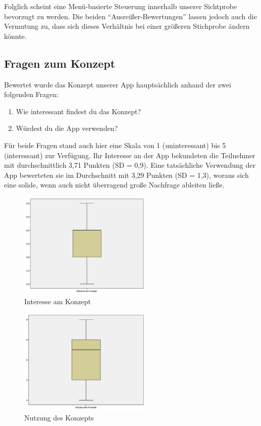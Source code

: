 \documentclass{chi-ext}
\begin{document}
Folglich scheint eine Menü-basierte Steuerung innerhalb unserer Sichtprobe bevorzugt zu werden. Die beiden “Ausreißer-Bewertungen” lassen jedoch auch die Vermutung zu, dass sich dieses Verhältnis bei einer größeren Stichprobe ändern könnte.

\subsection{Fragen zum Konzept}

Bewertet wurde das Konzept unserer App hauptsächlich anhand der zwei folgenden Fragen:
\begin{enumerate}
\item Wie interessant findest du das Konzept?
\item Würdest du die App verwenden?
\end{enumerate}


Für beide Fragen stand auch hier eine Skala von 1 (uninteressant) bis 5 (interessant) zur Verfügung.
Ihr Interesse an der App bekundeten die Teilnehmer mit durchschnittlich 3,71 Punkten (SD = 0,9). Eine tatsächliche Verwendung der App bewerteten sie im Durchschnitt mit 3,29 Punkten (SD = 1,3), woraus sich eine solide, wenn auch nicht überragend große Nachfrage ableiten ließe.

\begin{figure}
  \centering
  \includegraphics[width=180pt]{img/studie/Interesse_Konzept.jpg}
  \caption{Interesse am Konzept}
  \label{fig:studie_Interesse_Konzept}
\end{figure}

\begin{figure}
  \centering
  \includegraphics[width=180pt]{img/studie/Nutzung_des_Konzeptes.jpg}
  \caption{Nutzung des Konzepts}
  \label{fig:studie_Nutzung des Konzeptes}
\end{figure}
\end{document}
